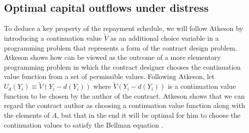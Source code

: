 \subsection{Optimal capital outflows under distress}

To deduce a key property of the repayment schedule, we will follow
Atkeson by introducing a continuation value $\tilde V$ as an
additional choice variable in a programming  problem that represents
a form of the contract design problem.
Atkeson shows how  can be viewed as the outcome
of a more elementary programming problem in which
the contract designer chooses  the continuation value
function from a set of permissible values.
Following Atkeson, let $U_d(Y_i) \equiv \tilde V(Y_i - d(Y_i))$
where $\tilde V(Y_i - d(Y_i))$ is a continuation value function to be
chosen by the author of the contract.   Atkeson shows that
we can regard the contract author as choosing a continuation
value function along with the elements of $A$, but that
in the end it will be optimal for him to choose the continuation
values  to satisfy
the Bellman equation .

